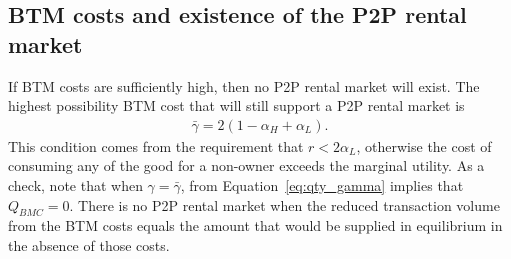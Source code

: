 \documentclass[11pt]{article}
\begin{document}
\subsection{BTM costs and existence of the P2P rental market}
If BTM costs are sufficiently high, then no P2P rental market will exist. 
The highest possibility BTM cost that will still support a P2P rental market is 
\begin{align} 
  \bar{\gamma} = 2(1-\alpha_H + \alpha_L). 
\end{align}
This condition comes from the requirement that  $r < 2 \alpha_L$, otherwise the cost of consuming any of the good for a non-owner exceeds the marginal utility. 
As a check, note that when $\gamma = \bar{\gamma}$, from Equation~\ref{eq:qty_gamma} implies that $Q_{BMC} = 0$.
There is no P2P rental market when the reduced transaction volume from the BTM costs equals the amount that would be supplied in equilibrium in the absence of those costs. 

\end{document}

